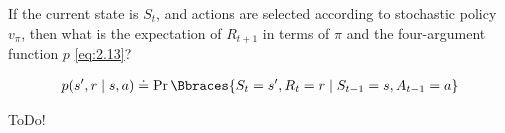 
\begin{exercise}[Exercise 3.11]

If the current state is $S_t$, and actions are selected according to stochastic policy $v_\pi$, then what is the expectation of $R_{t+1}$ in terms of $\pi$ and the four-argument function $p$ \eqref{eq:2.13}?

\begin{align} \label{eq:2.13}
    p(s^\prime, r \mid s, a)
    \doteq
    \Pr \Bbraces{S_t = s^\prime, R_t = r \mid S_{t-1} = s, A_{t-1} = a}
\end{align}

\end{exercise}


\begin{solution}

ToDo!

\end{solution}

